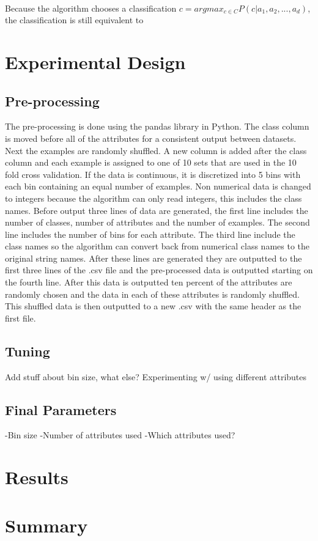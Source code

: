 \documentclass[twoside,11pt]{article}
\begin{document}
\paragraph{} Because the algorithm chooses a classification $c = argmax_{c \in C}P(c|a_1, a_2, ..., a_d)$, the classification is still equivalent to

\section{Experimental Design}

\subsection{Pre-processing}

The pre-processing is done using the pandas library in Python. The class column is moved before all of the attributes for a consistent output between datasets. Next the examples are randomly shuffled. A new column is added after the class column and each example is assigned to one of 10 sets that are used in the 10 fold cross validation. If the data is continuous, it is discretized into 5 bins with each bin containing an equal number of examples. Non numerical data is changed to integers because the algorithm can only read integers, this includes the class names. Before output three lines of data are generated, the first line includes the number of classes, number of attributes and the number of examples. The second line includes the number of bins for each attribute. The third line include the class names so the algorithm can convert back from numerical class names to the original string names. After these lines are generated they are outputted to the first three lines of the .csv file and the pre-processed data is outputted starting on the fourth line. After this data is outputted ten percent of the attributes are randomly chosen and the data in each of these attributes is randomly shuffled. This shuffled data is then outputted to a new .csv with the same header as the first file.  

\subsection{Tuning}

Add stuff about bin size, what else? \newline
Experimenting w/ using different attributes

\subsection{Final Parameters}

-Bin size \newline
-Number of attributes used \newline
-Which attributes used? \newline

\section{Results}

\section{Summary}


\end{document}
